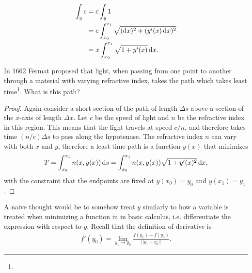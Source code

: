 \begin{align*}
  \int_{y} c
  &= c\int_{y}1 \\
  &= c\int_{x_{0}}^{x_{1}}\sqrt{(\dx)^{2} + (y'(x)\dx)^{2}} \\
  &= x\int_{x_0}^{x_1} \sqrt{1 + y'(x)} \dx.
\end{align*}

\begin{question*}
  In 1662 Fermat proposed that light, when passing from one point to another through a material with varying
  refractive index, takes the path which takes least time\footnote{}. What is this path?
\end{question*}

\begin{proof}
  Again consider a short section of the path of length $\Delta s$ above a section of the $x$-axis of
  length $\Delta x$. Let $c$ be the speed of light and $n$ be the refractive index in this region. This means
  that the light travels at speed $c/n$, and therefore takes time $(n/c)\Delta s$ to pass along the
  hypotenuse. The refractive index $n$ can vary with both $x$ and $y$, therefore a least-time path is a
  function $y(x)$ that minimizes
  \begin{align*}
    T = \int_{x_0}^{x_1} n(x, y(x)) \d s = \int_{x_0}^{x_1} n(x, y(x)) \sqrt{1 + y'(x)^2} \dx,
  \end{align*}
  with the constraint that the endpoints are fixed at $y(x_0) = y_0$ and $y(x_1) = y_1$.

\end{proof}

A naive thought would be to somehow treat $y$ similarly to how a variable is treated when minimizing a function
in in basic calculus, i.e. differentiate the expression with respect to $y$. Recall that the definition of
derivative is
\begin{align*}
  f'(y_0) = \lim_{y_1 \to y_0}\frac{f(y_1) - f(y_0)}{||y_1 - y_0||}.
\end{align*}


